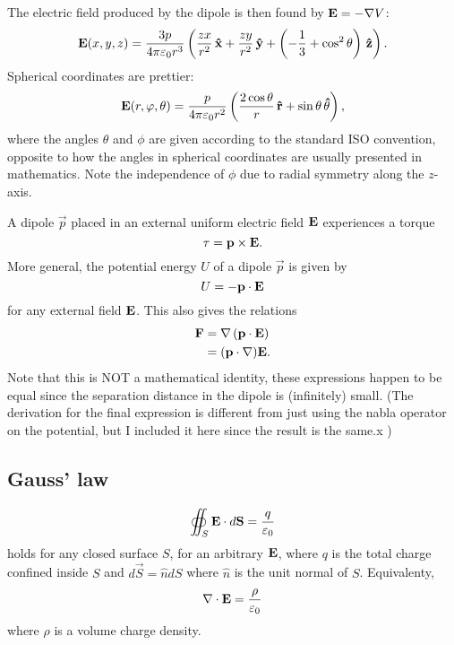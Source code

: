     The electric field produced by the dipole is then found by $\mathbf{E} = -\nabla V$:
    \begin{equation}
        \E(x, y, z) = \frac{3p}{4\pi\e r^3}\left(\frac{zx}{r^2}\,\hat{x} + 
        \frac{zy}{r^2}\,\hat{y} + \left( -\frac{1}{3} +\cos^2\theta\right)\,\hat{z}\right).
    \end{equation}
    Spherical coordinates are prettier: 
    \begin{equation}
        \E(r, \phi, \theta) = \frac{p}{4\pi\e r^2}\left(\frac{2\cos\theta}{r}\,\hat{r} + \sin\theta \, \hat{\theta}\right),
    \end{equation}
    where the angles $\theta$ and $\phi$ are given according to the standard ISO convention, 
    opposite to how the angles in spherical coordinates are usually presented in mathematics.
    Note the independence of $\phi$ due to radial symmetry along the $z$-axis. 
    
    A dipole $\vec{p}$ placed in an external uniform electric field $\mathbf{E}$ experiences a torque
    \begin{equation}
        \mathbf{\tau} = \mathbf{p} \times \mathbf{E}.
    \end{equation}
    More general, the potential energy $U$ of a dipole $\vec{p}$ is given by
    \begin{equation}
        U = -\mathbf{p}\cdot \mathbf{E}
    \end{equation}
    for any external field $\mathbf{E}$. This also gives the relations 
    \begin{align}
        \mathbf{F} &= \nabla\left(\mathbf{p}\cdot\mathbf{E}\right) \\
        &= (\mathbf{p}\cdot\nabla)\mathbf{E}.
    \end{align}
    Note that this is NOT a mathematical identity, these expressions happen to be equal since the separation distance in the dipole is (infinitely) small.
    (The derivation for the final expression is different from just using the nabla operator on the potential, but I included it here since the result is the same.x    )


\subsection{Gauss' law}
    \begin{equation}
        \oiint_S \mathbf{E}\cdot d\mathbf{S} = \frac{q}{\varepsilon_0}
    \end{equation}
    holds for any closed surface $S$, for an arbitrary $\mathbf{E}$, 
    where $q$ is the total charge confined inside $S$ and $d\vec{S} = \hat{n}dS$ where $\hat{n}$ is the unit normal of $S$. Equivalenty, 
    \begin{equation}
        \nabla \cdot \mathbf{E} = \frac{\rho}{\varepsilon_0}
    \end{equation}
    where $\rho$ is a volume charge density. 

